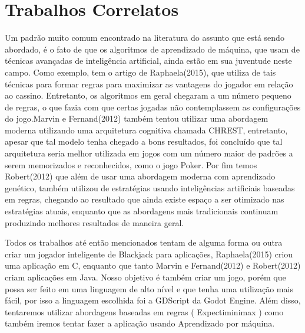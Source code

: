 \section{Trabalhos Correlatos}


    Um padrão muito comum encontrado na literatura do assunto que está sendo abordado, 
    é o fato de que os algoritmos de aprendizado de máquina, que usam de técnicas avançadas 
    de inteligência artificial, ainda estão em sua juventude neste campo. Como exemplo, tem o 
    artigo de Raphaela(2015), que utiliza de tais técnicas para formar regras para maximizar 
    as vantagens do jogador em relação ao cassino. Entretanto, os algoritmos em geral chegaram
    a um número pequeno de regras, o que fazia com que certas jogadas não contemplassem as configurações 
    do jogo.Marvin e Fernand(2012) também tentou utilizar uma abordagem moderna utilizando uma 
    arquitetura cognitiva chamada CHREST, entretanto, apesar que tal modelo tenha chegado a bons 
    resultados, foi concluído que tal arquitetura seria melhor utilizada em jogos com um número 
    maior de padrões a serem memorizados e reconhecidos, como o jogo Poker. Por fim temos Robert(2012)
    que além de usar uma abordagem moderna com aprendizado genético, também utilizou de estratégias usando 
    inteligências artificiais baseadas em regras, chegando ao resultado que ainda existe espaço a 
    ser otimizado nas estratégias atuais, enquanto que as abordagens mais tradicionais
    continuam produzindo melhores resultados de maneira geral.

    Todos os trabalhos até então mencionados tentam de alguma forma ou outra 
    criar um jogador inteligente de Blackjack para aplicações, Raphaela(2015) criou 
    uma aplicação em C, enquanto que tanto Marvin e Fernand(2012) e Robert(2012) criam 
    aplicações em Java. Nosso objetivo é também criar um jogo, porém que possa ser feito 
    em uma linguagem de alto nível e que tenha uma utilização mais fácil, por isso a linguagem 
    escolhida foi a GDScript da Godot Engine. Além disso, tentaremos utilizar abordagens baseadas 
    em regras ( Expectiminimax ) como também iremos tentar fazer a aplicação usando Aprendizado por máquina.